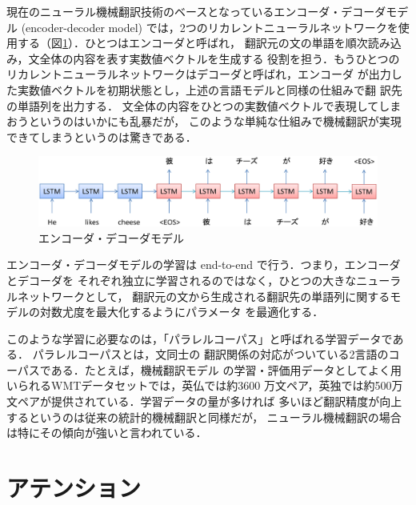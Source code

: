 現在のニューラル機械翻訳技術のベースとなっているエンコーダ・デコーダモデル (encoder-decoder model) \cite{sutskever2014seq} 
では，2つのリカレントニューラルネットワークを使用する（図\ref{fig:encdec}）．ひとつはエンコーダと呼ばれ，
翻訳元の文の単語を順次読み込み，文全体の内容を表す実数値ベクトルを生成する
役割を担う．もうひとつのリカレントニューラルネットワークはデコーダと呼ばれ，エンコーダ
が出力した実数値ベクトルを初期状態とし，上述の言語モデルと同様の仕組みで翻
訳先の単語列を出力する．
文全体の内容をひとつの実数値ベクトルで表現してしまおうというのはいかにも乱暴だが，
このような単純な仕組みで機械翻訳が実現できてしまうというのは驚きである．


\begin{figure}[t]
 \begin{center}
  \includegraphics[width=140mm]{images/TsuruokaLab/encdec.eps}
 \end{center}
 \caption{エンコーダ・デコーダモデル}
 \label{fig:encdec}
\end{figure}

エンコーダ・デコーダモデルの学習は end-to-end で行う．つまり，エンコーダとデコーダを
それぞれ独立に学習されるのではなく，ひとつの大きなニューラルネットワークとして，
翻訳元の文から生成される翻訳先の単語列に関するモデルの対数尤度を最大化するようにパラメータ
を最適化する．



このような学習に必要なのは，「パラレルコーパス」と呼ばれる学習データである．
パラレルコーパスとは，文同士の
翻訳関係の対応がついている2言語のコーパスである．たとえば，機械翻訳モデル
の学習・評価用データとしてよく用いられるWMTデータセットでは，英仏では約3600
万文ペア，英独では約500万文ペアが提供されている．学習データの量が多ければ
多いほど翻訳精度が向上するというのは従来の統計的機械翻訳と同様だが，
ニューラル機械翻訳の場合は特にその傾向が強いと言われている．


\section{アテンション}

